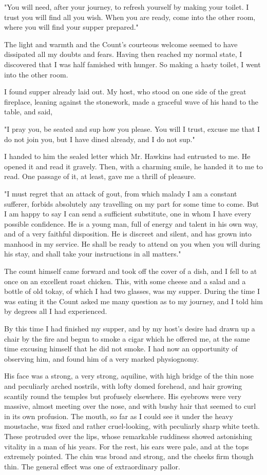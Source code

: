 "You will need, after your journey, to refresh yourself by making your toilet. I trust you will find all you wish. When you are ready, come into the other room, where you will find your supper prepared." 

The light and warmth and the Count's courteous welcome seemed to have dissipated all my doubts and fears. Having then reached my normal state, I discovered that I was half famished with hunger. So making a hasty toilet, I went into the other room. 

I found supper already laid out. My host, who stood on one side of the great fireplace, leaning against the stonework, made a graceful wave of his hand to the table, and said, 

"I pray you, be seated and sup how you please. You will I trust, excuse me that I do not join you, but I have dined already, and I do not sup." 

I handed to him the sealed letter which Mr. Hawkins had entrusted to me. He opened it and read it gravely. Then, with a charming smile, he handed it to me to read. One passage of it, at least, gave me a thrill of pleasure. 

"I must regret that an attack of gout, from which malady I am a constant sufferer, forbids absolutely any travelling on my part for some time to come. But I am happy to say I can send a sufficient substitute, one in whom I have every possible confidence. He is a young man, full of energy and talent in his own way, and of a very faithful disposition. He is discreet and silent, and has grown into manhood in my service. He shall be ready to attend on you when you will during his stay, and shall take your instructions in all matters." 

The count himself came forward and took off the cover of a dish, and I fell to at once on an excellent roast chicken. This, with some cheese and a salad and a bottle of old tokay, of which I had two glasses, was my supper. During the time I was eating it the Count asked me many question as to my journey, and I told him by degrees all I had experienced. 

By this time I had finished my supper, and by my host's desire had drawn up a chair by the fire and begun to smoke a cigar which he offered me, at the same time excusing himself that he did not smoke. I had now an opportunity of observing him, and found him of a very marked physiognomy. 

His face was a strong, a very strong, aquiline, with high bridge of the thin nose and peculiarly arched nostrils, with lofty domed forehead, and hair growing scantily round the temples but profusely elsewhere. His eyebrows were very massive, almost meeting over the nose, and with bushy hair that seemed to curl in its own profusion. The mouth, so far as I could see it under the heavy moustache, was fixed and rather cruel-looking, with peculiarly sharp white teeth. These protruded over the lips, whose remarkable ruddiness showed astonishing vitality in a man of his years. For the rest, his ears were pale, and at the tops extremely pointed. The chin was broad and strong, and the cheeks firm though thin. The general effect was one of extraordinary pallor. 


